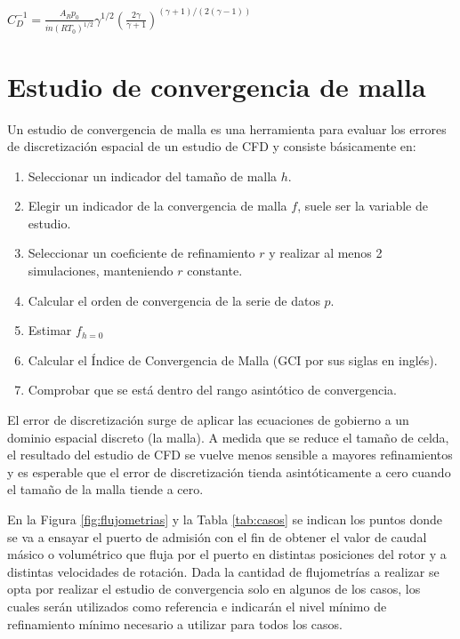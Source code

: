 \begin{math}
C_D^{-1} =  \frac {A_R p_0} {\dot{m} (R T_0)^{1/2}}
            \gamma^{1/2}
            \left( \frac{2\gamma}{\gamma+1} \right)^{(\gamma+1)/(2(\gamma-1))}
\end{math}

\section{Estudio de convergencia de malla}

Un estudio de convergencia de malla es una herramienta para evaluar los errores
de discretización espacial de un estudio de CFD y consiste básicamente en:

\begin{enumerate}
    \item Seleccionar un indicador del tamaño de malla $h$.
    \item Elegir un indicador de la convergencia de malla $f$, suele ser la
        variable de estudio.
    \item Seleccionar un coeficiente de refinamiento $r$ y realizar al menos 2
        simulaciones, manteniendo $r$ constante.
    \item Calcular el orden de convergencia de la serie de datos $p$.
    \item Estimar $f_{h=0}$
    \item Calcular el Índice de Convergencia de Malla (GCI por sus siglas en
        inglés).
    \item Comprobar que se está dentro del rango asintótico de convergencia.
\end{enumerate}

El error de discretización surge de aplicar las ecuaciones de gobierno a un
dominio espacial discreto (la malla).
%
A medida que se reduce el tamaño de celda, el resultado del estudio de CFD se
vuelve menos sensible a mayores refinamientos y es esperable que el error de
discretización tienda asintóticamente a cero cuando el tamaño de la malla
tiende a cero.

En la Figura \ref{fig:flujometrias} y la Tabla \ref{tab:casos} se indican los
puntos donde se va a ensayar el puerto de admisión con el fin de obtener el
valor de caudal másico o volumétrico que fluja por el puerto en distintas
posiciones del rotor y a distintas velocidades de rotación.
%
Dada la cantidad de flujometrías a realizar se opta por realizar el estudio de
convergencia solo en algunos de los casos, los cuales serán utilizados como
referencia e indicarán el nivel mínimo de refinamiento mínimo necesario a
utilizar para todos los casos.

